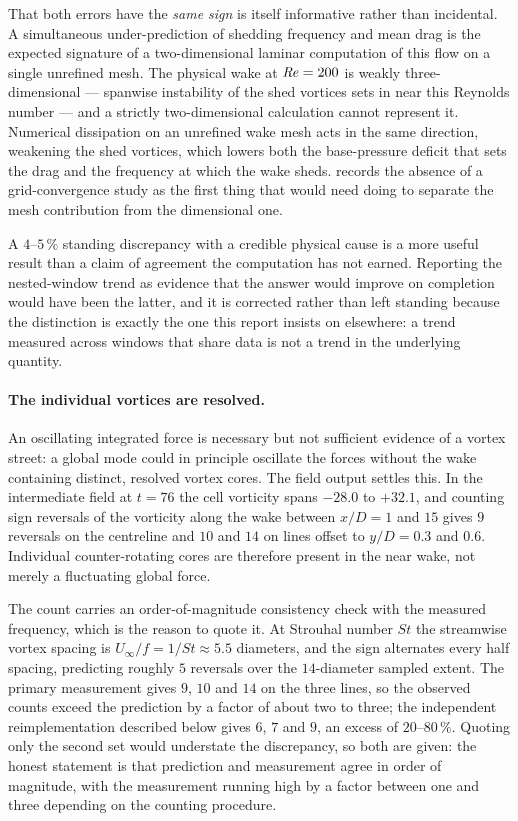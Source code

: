 That both errors have the \emph{same sign} is itself informative rather than incidental.
A simultaneous under-prediction of shedding frequency and mean drag is the expected
signature of a two-dimensional laminar computation of this flow on a single unrefined
mesh. The physical wake at $\mathit{Re}=200$ is weakly three-dimensional --- spanwise
instability of the shed vortices sets in near this Reynolds number --- and a strictly
two-dimensional calculation cannot represent it. Numerical dissipation on an unrefined
wake mesh acts in the same direction, weakening the shed vortices, which lowers both the
base-pressure deficit that sets the drag and the frequency at which the wake sheds.
 records the absence of a grid-convergence study as the first thing
that would need doing to separate the mesh contribution from the dimensional one.

A $4$--$5\,\%$ standing discrepancy with a credible physical cause is a more useful
result than a claim of agreement the computation has not earned. Reporting the nested-window
trend as evidence that the answer would improve on completion would have been the latter,
and it is corrected rather than left standing because the distinction is exactly the one
this report insists on elsewhere: a trend measured across windows that share data is not
a trend in the underlying quantity.

\paragraph{The individual vortices are resolved.} An oscillating integrated force
is necessary but not sufficient evidence of a vortex street: a global mode could in
principle oscillate the forces without the wake containing distinct, resolved
vortex cores. The field output settles this. In the intermediate field at $t=76$
the cell vorticity spans $-28.0$ to $+32.1$, and counting sign reversals of the
vorticity along the wake between $x/D=1$ and $15$ gives $9$ reversals on the
centreline and $10$ and $14$ on lines offset to $y/D=0.3$ and $0.6$. Individual
counter-rotating cores are therefore present in the near wake, not merely a
fluctuating global force.

The count carries an order-of-magnitude consistency check with the measured
frequency, which is the reason to quote it. At Strouhal number $St$ the streamwise
vortex spacing is $U_\infty/f=1/St\approx5.5$ diameters, and the sign alternates
every half spacing, predicting roughly $5$ reversals over the $14$-diameter sampled
extent. The primary measurement gives $9$, $10$ and $14$ on the three lines, so the
observed counts exceed the prediction by a factor of about two to three; the
independent reimplementation described below gives $6$, $7$ and $9$, an excess of
$20$--$80\,\%$. Quoting only the second set would understate the discrepancy, so both
are given: the honest statement is that prediction and measurement agree in order of
magnitude, with the measurement running high by a factor between one and three
depending on the counting procedure.


